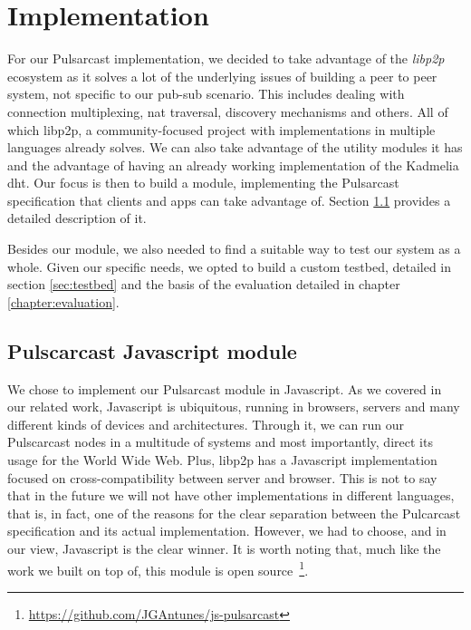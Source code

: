
\chapter{Implementation}
\label{chapter:implementation}

For our Pulsarcast implementation, we decided to take advantage of the
\emph{libp2p} ecosystem as it solves a lot of the underlying issues of building
a peer to peer system, not specific to our pub-sub scenario. This includes
dealing with connection multiplexing, \acrshort{nat} traversal, discovery
mechanisms and others.  All of which libp2p, a community-focused project with
implementations in multiple languages already solves. We can also take
advantage of the utility modules it has and the advantage of having an already
working implementation of the Kadmelia \acrshort{dht}. Our focus is then to
build a module, implementing the Pulsarcast specification that clients and apps
can take advantage of. Section \ref{pulsarcast-javascript-module} provides a
detailed description of it.

Besides our module, we also needed to find a suitable way to test our system as
a whole. Given our specific needs, we opted to build a custom testbed, detailed
in section \ref{sec:testbed} and the basis of the evaluation detailed in chapter
\ref{chapter:evaluation}. 

\section{Pulscarcast Javascript module}\label{pulsarcast-javascript-module}

We chose to implement our Pulsarcast module in Javascript. As we covered in our
related work, Javascript is ubiquitous, running in browsers, servers and many
different kinds of devices and architectures. Through it, we can run our
Pulscarcast nodes in a multitude of systems and most importantly, direct its
usage for the World Wide Web. Plus, libp2p has a Javascript implementation
focused on cross-compatibility between server and browser. This is not to say
that in the future we will not have other implementations in different
languages, that is, in fact, one of the reasons for the clear separation
between the Pulcarcast specification and its actual implementation.  However,
we had to choose, and in our view, Javascript is the clear winner. It is worth
noting that, much like the work we built on top of, this module is open
source~\footnote{\url{https://github.com/JGAntunes/js-pulsarcast}}.

